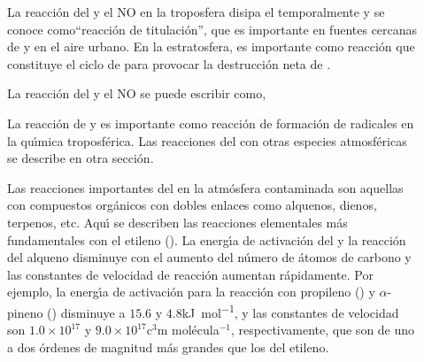 \begin{description}
\item[ ]
La reacci\'on del  y el NO en la troposfera disipa el  temporalmente y se conoce como``reacci\'on de titulaci\'on'', que es importante en fuentes cercanas de  y en el aire urbano. En la estratosfera, es importante como reacci\'on que constituye  el ciclo de  para provocar la destrucci\'on neta de .

La reacci\'on del  y el NO se puede escribir como,
\item[ ]
La reacci\'on de  y  es importante como reacci\'on de formaci\'on de radicales  en la qu\'{\i}mica troposf\'erica. Las reacciones del  con otras especies atmosf\'ericas se describe en otra secci\'on.

\item[ ]
Las reacciones importantes del   en la atm\'osfera contaminada son aquellas con compuestos org\'anicos con dobles enlaces como alquenos, dienos, terpenos, etc. Aqu\'{\i} se describen las reacciones elementales m\'as fundamentales con el etileno ().
La energ\'{\i}a de activaci\'on del  y la reacci\'on del alqueno disminuye con el aumento del n\'umero de \'atomos de carbono y las constantes de velocidad de reacci\'on aumentan r\'apidamente. Por ejemplo, la energ\'{\i}a de activaci\'on para la reacci\'on con propileno () y $\alpha$-pineno () disminuye a $15.6$ y $4.8$\si{\kilo\joule\per\mole}, y las constantes de velocidad son $1.0\times10^{17}$ y $9.0\times10^{17}\si{\cubic\centi\metre}$ mol\'ecula$^{-1}$, respectivamente, que son de uno a dos \'ordenes de magnitud m\'as grandes que los del etileno.


\end{description}
